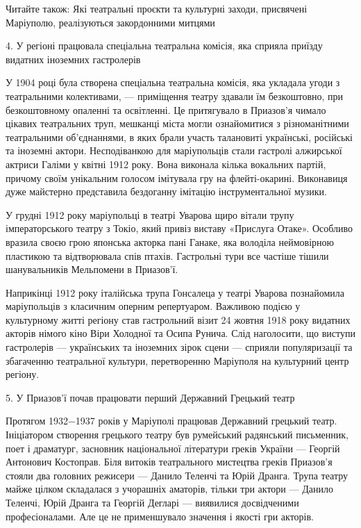 Читайте також: Які театральні проєкти та культурні заходи, присвячені
Маріуполю, реалізуються закордонними митцями

4. У регіоні працювала спеціальна театральна комісія, яка сприяла приїзду
видатних іноземних гастролерів

У 1904 році була створена спеціальна театральна комісія, яка укладала угоди з
театральними колективами, — приміщення театру здавали їм безкоштовно, при
безкоштовному опаленні та освітленні. Це притягувало в Приазов'я чимало цікавих
театральних труп, мешканці міста могли ознайомитися з різноманітними
театральними об'єднаннями, в яких брали участь талановиті українські, російські
та іноземні актори. Несподіванкою для маріупольців стали гастролі алжирської
актриси Галіми у квітні 1912 року. Вона виконала кілька вокальних партій,
причому своїм унікальним голосом імітувала гру на флейті-окарині. Виконавиця
дуже майстерно представила бездоганну імітацію інструментальної музики.

У грудні 1912 року маріупольці в театрі Уварова щиро вітали трупу
імператорського театру з Токіо, який привіз виставу «Прислуга Отаке». Особливо
вразила своєю грою японська акторка пані Ганаке, яка володіла неймовірною
пластикою та відтворювала спів птахів. Гастрольні тури все частіше тішили
шанувальників Мельпомени в Приазов'ї.

Наприкінці 1912 року італійська трупа Гонсалеца у театрі Уварова познайомила
маріупольців з класичним оперним репертуаром. Важливою подією у культурному
житті регіону став гастрольний візит 24 жовтня 1918 року видатних акторів
німого кіно Віри Холодної та Осипа Рунича. Слід наголосити, що виступи
гастролерів — українських та іноземних зірок сцени — сприяли популяризації та
збагаченню театральної культури, перетворенню Маріуполя на культурний центр
регіону.

5. У Приазов'ї почав працювати перший Державний Грецький театр

Протягом 1932−1937 років у Маріуполі працював Державний грецький театр.
Ініціатором створення грецького театру був румейський радянський письменник,
поет і драматург, засновник національної літератури греків України — Георгій
Антонович Костоправ. Біля витоків театрального мистецтва греків Приазов'я
стояли два головних режисери — Данило Теленчі та Юрій Дранга. Трупа театру
майже цілком складалася з учорашніх аматорів, тільки три актори — Данило
Теленчі, Юрій Дранга та Георгій Дегларі — виявилися досвідченими
професіоналами. Але це не применшувало значення і якості гри акторів.

